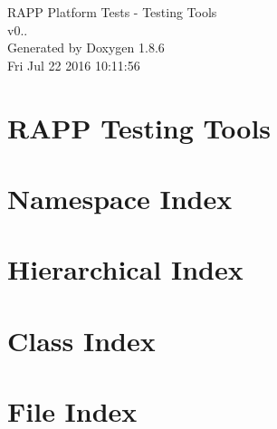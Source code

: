 \documentclass[twoside]{book}
\newcommand{\clearemptydoublepage}{%
  \newpage{\pagestyle{empty}\cleardoublepage}%
}
\begin{document}
\hypersetup{pageanchor=false}
\begin{titlepage}
\vspace*{7cm}
\begin{center}%
{\Large R\-A\-P\-P Platform Tests -\/ Testing Tools \\[1ex]\large v0.. }\\
\vspace*{1cm}
{\large Generated by Doxygen 1.8.6}\\
\vspace*{0.5cm}
{\small Fri Jul 22 2016 10:11:56}\\
\end{center}
\end{titlepage}
\clearemptydoublepage
\tableofcontents
\clearemptydoublepage
{}
\hypersetup{pageanchor=true}

\chapter{R\-A\-P\-P Testing Tools}
\label{md__home_travis_rapp_temp_rapp-platform_rapp_testing_tools_README}
\hypertarget{md__home_travis_rapp_temp_rapp-platform_rapp_testing_tools_README}{}

\chapter{Namespace Index}

\chapter{Hierarchical Index}

\chapter{Class Index}

\chapter{File Index}

\end{document}
